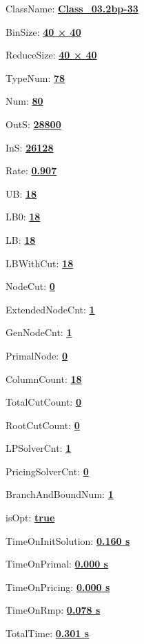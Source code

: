 \documentclass[11pt]{article}
\begin{document}
\pagestyle{empty}


ClassName: \underline{\textbf{Class_03.2bp-33}}
\par
BinSize: \underline{\textbf{40 × 40}}
\par
ReduceSize: \underline{\textbf{40 × 40}}
\par
TypeNum: \underline{\textbf{78}}
\par
Num: \underline{\textbf{80}}
\par
OutS: \underline{\textbf{28800}}
\par
InS: \underline{\textbf{26128}}
\par
Rate: \underline{\textbf{0.907}}
\par
UB: \underline{\textbf{18}}
\par
LB0: \underline{\textbf{18}}
\par
LB: \underline{\textbf{18}}
\par
LBWithCut: \underline{\textbf{18}}
\par
NodeCut: \underline{\textbf{0}}
\par
ExtendedNodeCnt: \underline{\textbf{1}}
\par
GenNodeCnt: \underline{\textbf{1}}
\par
PrimalNode: \underline{\textbf{0}}
\par
ColumnCount: \underline{\textbf{18}}
\par
TotalCutCount: \underline{\textbf{0}}
\par
RootCutCount: \underline{\textbf{0}}
\par
LPSolverCnt: \underline{\textbf{1}}
\par
PricingSolverCnt: \underline{\textbf{0}}
\par
BranchAndBoundNum: \underline{\textbf{1}}
\par
isOpt: \underline{\textbf{true}}
\par
TimeOnInitSolution: \underline{\textbf{0.160 s}}
\par
TimeOnPrimal: \underline{\textbf{0.000 s}}
\par
TimeOnPricing: \underline{\textbf{0.000 s}}
\par
TimeOnRmp: \underline{\textbf{0.078 s}}
\par
TotalTime: \underline{\textbf{0.301 s}}
\par
\newpage


\end{document}
